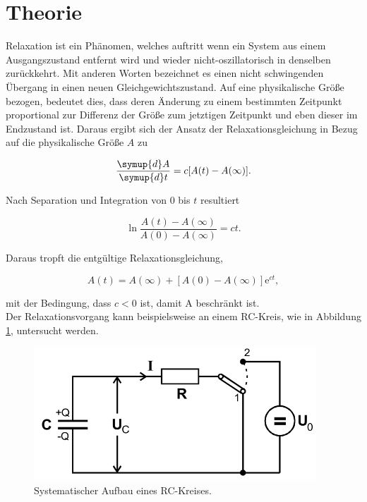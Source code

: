 \section{Theorie}
\label{sec:Theorie}
Relaxation ist ein Phänomen, welches auftritt wenn ein System aus einem Ausgangszustand entfernt wird und wieder nicht-oszillatorisch in denselben zurückkehrt.
Mit anderen Worten bezeichnet es einen nicht schwingenden Übergang in einen neuen Gleichgewichtszustand.
Auf eine physikalische Größe bezogen, bedeutet dies, dass deren Änderung zu einem bestimmten Zeitpunkt proportional zur Differenz der Größe zum jetztigen Zeitpunkt und eben dieser im Endzustand ist.
Daraus ergibt sich der Ansatz der Relaxationsgleichung in Bezug auf die physikalische Größe $A$ zu

\begin{equation}
 \frac{\symup{d} A}{\symup{d} t} = c [A(t) - A(\infty)].
\end{equation}

Nach Separation und Integration von $0$ bis $t$ resultiert

\begin{equation}
 \ln\frac{A(t)-A(\infty)}{A(0)-A(\infty)} = ct.
\end{equation}

Daraus tropft die entgültige Relaxationsgleichung,

\begin{equation}
  A(t) = A(\infty) + [A(0) - A(\infty)] \mathrm{e}^{ct}, \label{eqn:gl}
\end{equation}

mit der Bedingung, dass $c<0$ ist, damit A beschränkt ist.\\
Der Relaxationsvorgang kann beispielsweise an einem RC-Kreis, wie in Abbildung \ref{fig:1}, untersucht werden.

\begin{figure}[H]
  \centering
  \includegraphics[height=5cm]{kreis.png}
  \caption{Systematischer Aufbau eines RC-Kreises. \cite{sample}}
  \label{fig:1}
\end{figure}

